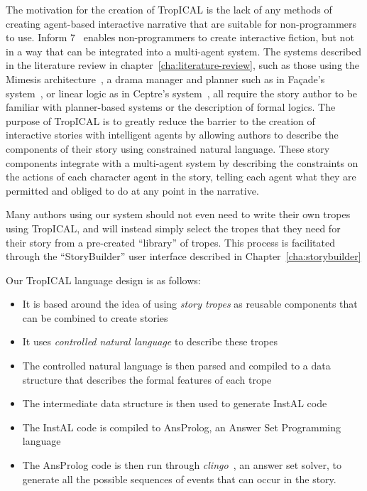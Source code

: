 \documentclass[11pt]{report}
\begin{document}
The motivation for the creation of TropICAL is the lack of any methods of
creating agent-based interactive narrative that are suitable for non-programmers
to use. Inform 7~\citep{reed2010creating} enables non-programmers to create
interactive fiction, but not in a way that can be integrated into a multi-agent
system.
The systems described in the literature review in
chapter~\ref{cha:literature-review}, such as those using the Mimesis
architecture~\citep{young2004architecture}, a drama manager and planner such as
in Fa\c{c}ade's system~\citep{mateas2003faccade}, or linear logic as in Ceptre's
system~\citep{martens2015ceptre}, all require the story author to be familiar with
planner-based systems or the description of formal logics. The purpose of
TropICAL is to greatly reduce the barrier to the creation of interactive stories
with intelligent agents by allowing authors to describe the components of their story using constrained
natural language. These story components integrate with a multi-agent system by
describing the constraints on the actions of each character agent in the story,
telling each agent what they are permitted and obliged to do at any point in the
narrative.

Many authors using our system should not even need to
write their own tropes using TropICAL, and will instead simply select the tropes
that they need for their story from a pre-created ``library'' of tropes. This
process is facilitated through the ``StoryBuilder'' user interface described in
Chapter~\ref{cha:storybuilder}

Our TropICAL language design is as follows:

\begin{itemize}
  \item It is based around the idea of using \emph{story tropes} as reusable
    components that can be combined to create stories
  \item It uses \emph{controlled natural language} to describe these tropes
  \item The controlled natural language is then parsed and compiled to a data
    structure that describes the formal features of each trope
  \item The intermediate data structure is then used to generate InstAL code
  \item The InstAL code is compiled to AnsProlog, an Answer Set Programming
    language
  \item The AnsProlog code is then run through
    \emph{clingo}~\citep{gebser2011potassco}, an answer set solver, to generate
    all the possible sequences of events that can occur in the story.
\end{itemize}
\end{document}
